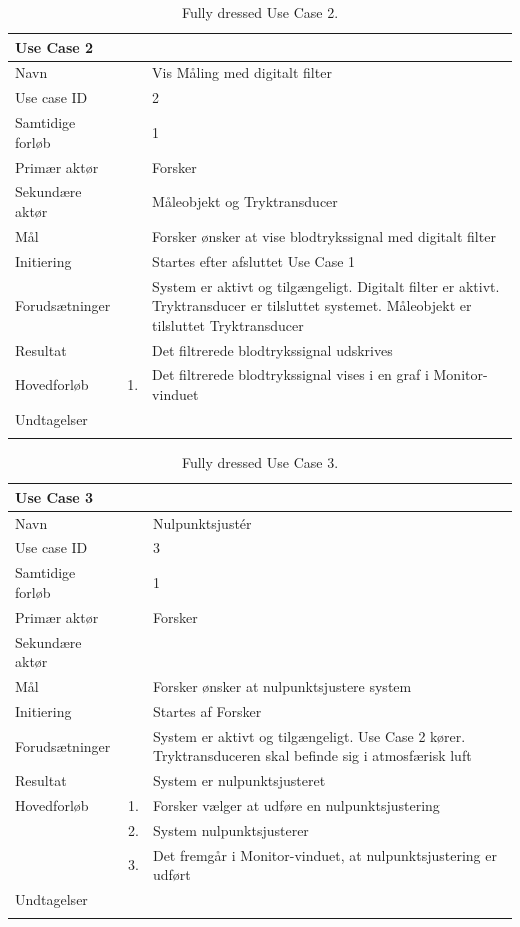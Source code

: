 \begin{longtabu} to  %
    {\large \textbf{Use Case 2}} && \\
    \toprule
    Navn &&    Vis Måling med digitalt filter\\
    Use case ID &&    2\\
    Samtidige forløb &&    1\\
    Primær aktør &&    Forsker\\
    Sekundære aktør &&	 Måleobjekt og Tryktransducer\\
    Mål &&    Forsker ønsker at vise blodtrykssignal med digitalt filter\\
    Initiering &&	Startes efter afsluttet Use Case 1\\
    Forudsætninger &&  System er aktivt og tilgængeligt. Digitalt filter er aktivt. Tryktransducer er tilsluttet systemet. Måleobjekt er tilsluttet Tryktransducer\\
    Resultat &&		Det filtrerede blodtrykssignal udskrives                         \\ \midrule
    Hovedforløb &    1. &    Det filtrerede blodtrykssignal vises i en graf i Monitor-vinduet\newline\\ \midrule
                
    Undtagelser &    &   \\ \bottomrule
\caption{Fully dressed Use Case 2.}
\label{UC2}
\end{longtabu}


\begin{longtabu} to  %
    {\large \textbf{Use Case 3}} && \\
    \toprule
    Navn &&    Nulpunktsjustér\\
    Use case ID &&    3\\
    Samtidige forløb &&    1\\
    Primær aktør &&    Forsker\\
    Sekundære aktør && \\
    Mål &&    Forsker ønsker at nulpunktsjustere system\\
    Initiering &&	Startes af Forsker\\
    Forudsætninger &&  System er aktivt og tilgængeligt. Use Case 2 kører. Tryktransduceren skal befinde sig i atmosfærisk luft  \\    
    Resultat &&		System er nulpunktsjusteret\\ \midrule
    Hovedforløb &    1. &    Forsker vælger at udføre en nulpunktsjustering\\[-1ex]   						 	
                &    2. &    System nulpunktsjusterer\\[-1ex]
                &	 3.	&	 Det fremgår i Monitor-vinduet, at nulpunktsjustering er udført\newline\\ \midrule
                
    Undtagelser &     &      \\ \bottomrule
\caption{Fully dressed Use Case 3.}
\label{UC3}
\end{longtabu}

